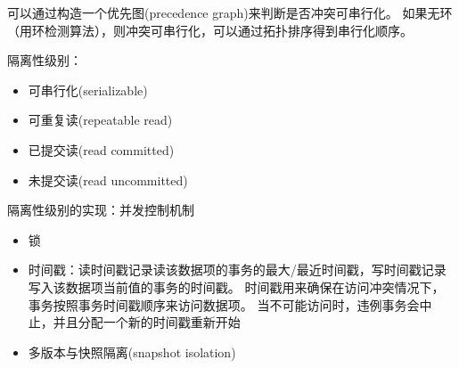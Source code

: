 可以通过构造一个优先图(precedence graph)来判断是否冲突可串行化。
如果无环（用环检测算法），则冲突可串行化，可以通过拓扑排序得到串行化顺序。

隔离性级别：
\begin{itemize}
	\item 可串行化(serializable)
	\item 可重复读(repeatable read)
	\item 已提交读(read committed)
	\item 未提交读(read uncommitted)
\end{itemize}

隔离性级别的实现：并发控制机制
\begin{itemize}
	\item 锁
	\item 时间戳：读时间戳记录读该数据项的事务的最大/最近时间戳，写时间戳记录写入该数据项当前值的事务的时间戳。
	时间戳用来确保在访问冲突情况下，事务按照事务时间戳顺序来访问数据项。
	当不可能访问时，违例事务会中止，并且分配一个新的时间戳重新开始
	\item 多版本与快照隔离(snapshot isolation)
\end{itemize}